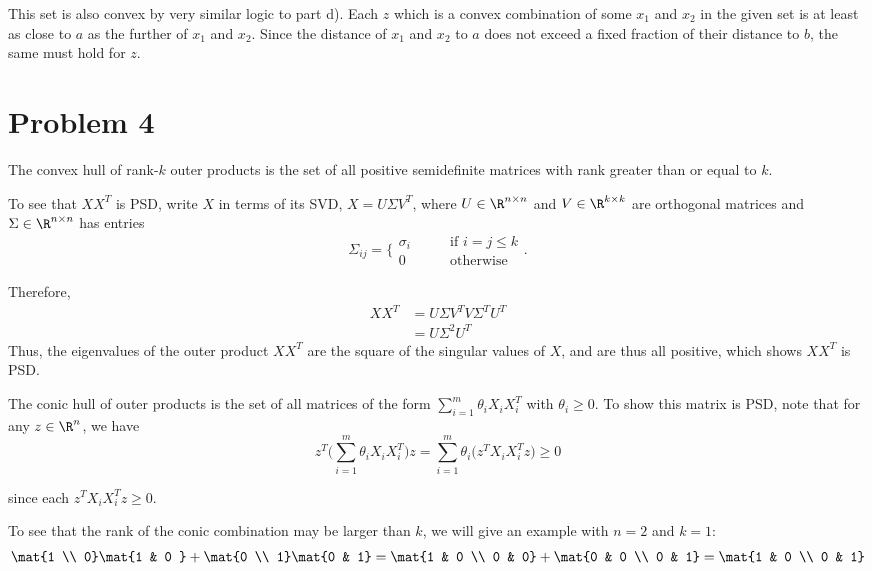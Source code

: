 \documentclass{homework}
\begin{document}
\begin{letterenum}
\item This set is also convex by very similar logic to part d). Each $z$ which is a convex combination
of some $x_1$ and $x_2$ in the given set is at least as close to $a$ as the further of $x_1$ and $x_2$.
Since the distance of $x_1$ and $x_2$ to $a$ does not exceed a fixed fraction of their distance
to $b$, the same must hold for $z$.

\end{letterenum}

\section{Problem 4}
The convex hull of rank-$k$ outer products is the set of all positive semidefinite matrices
with rank greater than or equal to $k$.

To see that $X X^T$ is PSD, write $X$ in terms of its SVD, $X = U\Sigma V^T$, where $U\in\R^{n \times n}$
and $V \in \R^{k \times k}$ are orthogonal matrices and $\Sigma \in \R^{n\times n}$ has entries
\begin{equation*}
    \Sigma_{ij} = \biggl\{
        \begin{array}{ll}
            \sigma_i &\qquad \text{if } i = j \leq k \\
            0 &\qquad \text{otherwise}
        \end{array}
    \biggr.
\end{equation*}

Therefore,
\begin{align*}
    XX^T &= U\Sigma V^T V \Sigma^T U^T \\
        &= U \Sigma^2 U^T
\end{align*}
Thus, the eigenvalues of the outer product $XX^T$ are the square of the singular values of $X$, and are thus
all positive, which shows $XX^T$ is PSD.

The conic hull of outer products is the set of all matrices of the form
$\sum_{i=1}^m \theta_i X_i X_i^T$ with $\theta_i \geq 0$. To show this matrix is PSD, note 
that for any $z \in \R^n$, we have
\begin{equation*}
    z^T \biggl( \sum_{i=1}^{m} \theta_i X_i X_i^T \biggr) z =
        \sum_{i=1}^{m} \theta_i \biggl(z^T X_i X_i^T z\biggr) \geq 0
\end{equation*}

since each $z^T X_i X_i^T z \geq 0$.

To see that the rank of the conic combination may be larger than $k$, we will give an example
with $n = 2$ and $k=1$:
\begin{equation*}
    \mat{1 \\ 0} \mat{1 & 0 } + \mat{0 \\ 1} \mat{0 & 1} = \mat{1 & 0 \\ 0 & 0} + \mat{0 & 0 \\ 0 & 1} = \mat{1 & 0 \\ 0 & 1}
\end{equation*}
\end{document}
